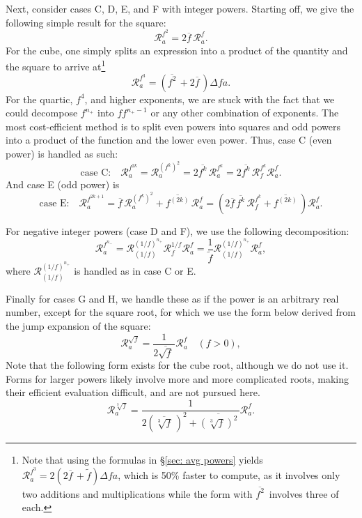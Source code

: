 \documentclass[10pt]{article}
\renewcommand{\j}[1]{\Delta #1}
\newcommand{\jr}[2]{\mathcal{R}^{#1}_{#2}}
\newcommand{\avg}[1]{\overline{#1}\,}
\newcommand{\invavg}[1]{\widetilde{#1}}
\begin{document}
Next, consider cases C, D, E, and F with integer powers.
Starting off, we give the following simple result for the square:
\begin{equation}
	\jr{f^2}{a} = 2\avg{f}\jr{f}{a}.
\end{equation}
For the cube, one simply splits an expression into a product of the quantity and the square to arrive at\footnote{Note that using the formulas in \S\ref{sec: avg powers} yields $\jr{f^3}{a} = 2\left(2\avg{f} + \invavg{f}\right)\j{f}{a}$, which is 50\% faster to compute, as it involves only two additions and multiplications while the form with $\avg{f^2}$ involves three of each.}
\begin{equation}
	\jr{f^3}{a} = \left(\avg{f^2} + 2\avg{f}\right)\j{f}{a}.
\end{equation}
For the quartic, $f^4$, and higher exponents, we are stuck with the fact that we could decompose $f^{n_+}$ into $ff^{n_+-1}$ or any other combination of exponents.
The most cost-efficient method is to split even powers into squares and odd powers into a product of the function and the lower even power.
Thus, case C (even power) is handled as such:
\begin{equation}
	\text{case C:} \quad \jr{f^{2k}}{a} = \jr{(f^k)^2}{a} = 2\avg{f^k}\jr{f^k}{a} = 2\avg{f^k}\jr{f^k}{f}\jr{f}{a}.
\end{equation}
And case E (odd power) is
\begin{equation}
	\text{case E:} \quad \jr{f^{2k+1}}{a} = \avg{f}\jr{(f^k)^2}{a} + \avg{f^{(2k)}}\jr{f}{a} = \left(2\avg{f}\avg{f^k}\jr{f^k}{f} + \avg{f^{(2k)}}\right)\jr{f}{a}.
\end{equation}

For negative integer powers (case D and F), we use the following decomposition:
\begin{equation}
	\jr{f^{n_-}}{a} = \jr{(1/f)^{n_+}}{(1/f)}\jr{1/f}{f}\jr{f}{a} = \frac{1}{\invavg{f}}\jr{(1/f)^{n_+}}{(1/f)}\jr{f}{a},
\end{equation}
where $\jr{(1/f)^{n_+}}{(1/f)}$ is handled as in case C or E.

Finally for cases G and H, we handle these as if the power is an arbitrary real number, except for the square root, for which we use the form below derived from the jump expansion of the square:
\begin{equation}
	\jr{\sqrt{f}}{a} = \frac{1}{2\avg{\sqrt{f}}}\jr{f}{a} \quad (f>0),
\end{equation}
Note that the following form exists for the cube root, although we do not use it.
Forms for larger powers likely involve more and more complicated roots, making their efficient evaluation difficult, and are not pursued here.
\begin{equation}
	\jr{\sqrt[3]{f}}{a} = \frac{1}{2\left(\avg{\sqrt[3]{f}}\right)^2 + \avg{\left(\sqrt[3]{f}\right)^2}}\jr{f}{a}.
\end{equation}
\end{document}
